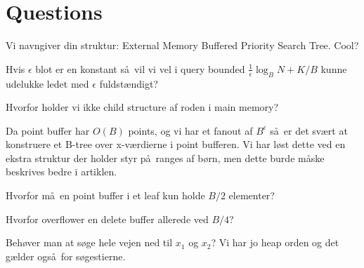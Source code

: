 \documentclass[a4paper,11pt,agenda,chair]{meetingmins}
\begin{document}
\maketitle

\section{Questions}
\begin{items}
\item Vi navngiver din struktur: External Memory Buffered Priority Search Tree. Cool?

\item Hvis $\epsilon$ blot er en konstant s\aa ~vil vi vel i query bounded $\frac{1}{\epsilon} \log_B N + K/B$ kunne udelukke ledet med $\epsilon$ fuldst\ae ndigt?

\item Hvorfor holder vi ikke child structure af roden i main memory?

\item Da point buffer har $O(B)$ points, og vi har et fanout af $B^\epsilon$ s\aa ~er det sv\ae rt at konstruere et B-tree over x-v\ae rdierne i point bufferen. Vi har l\o st dette ved en ekstra struktur der holder styr p\aa ~ranges af b\o rn, men dette burde m\aa ske beskrives bedre i artiklen.

\item Hvorfor m\aa ~en point buffer i et leaf kun holde $B/2$ elementer?

\item Hvorfor overflower en delete buffer allerede ved $B/4$?

\item Beh\o ver man at s\o ge hele vejen ned til $x_1$ og $x_2$? Vi har jo heap orden og det g\ae lder ogs\aa ~for s\o gestierne.
\end{items}
\end{document}
